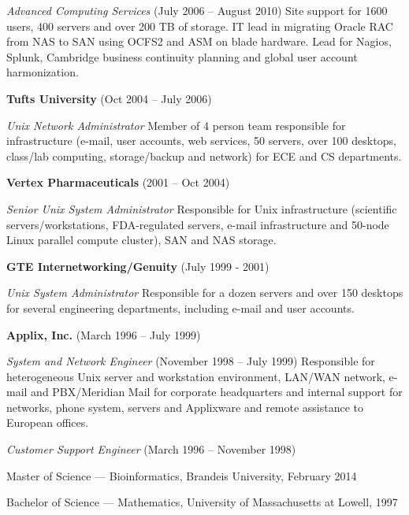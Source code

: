 \documentclass[11pt,article,oneside]{memoir}
\begin{document}
\noindent\textit{Advanced Computing Services} (July 2006 -- August
2010) Site support for 1600 users, 400 servers and over 200 TB of
storage. IT lead in migrating Oracle RAC from NAS to SAN using OCFS2
and ASM on blade hardware. Lead for Nagios, Splunk, Cambridge business
continuity planning and global user account harmonization.

\ind\textbf{Tufts University} (Oct 2004 -- July 2006)

\noindent\textit{Unix Network Administrator} Member of 4 person team
responsible for infrastructure (e-mail, user accounts, web services,
50 servers, over 100 desktops, class/lab computing, storage/backup and
network) for ECE and CS departments.

\ind \textbf{Vertex Pharmaceuticals} (2001 -- Oct 2004)

\noindent\textit{Senior Unix System Administrator} Responsible for
Unix infrastructure (scientific servers/workstations, FDA-regulated
servers, e-mail infrastructure and 50-node Linux parallel compute
cluster), SAN and NAS storage.

\ind \textbf{GTE Internetworking/Genuity} (July 1999 - 2001)

\noindent\textit{Unix System Administrator} Responsible for a dozen
servers and over 150 desktops for several engineering departments,
including e-mail and user accounts.

\ind \textbf{Applix, Inc.} (March 1996 -- July 1999)

\noindent\textit{System and Network Engineer} (November 1998 -- July
1999) Responsible for heterogeneous Unix server and workstation
environment, LAN/WAN network, e-mail and PBX/Meridian Mail for
corporate headquarters and internal support for networks, phone
system, servers and Applixware and remote assistance to European
offices.

\noindent\textit{Customer Support Engineer} (March 1996 -- November
1998)

\bigskip



\ind Master of Science --- Bioinformatics, Brandeis University, February 2014

\ind Bachelor of Science --- Mathematics, University of Massachusetts at Lowell, 1997
\end{document}
